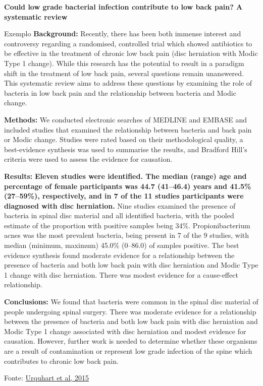 \documentclass{beamer}
\begin{document}
\begin{frame}{\tiny \bf Could low grade bacterial infection contribute to low back pain? A systematic review}
  \begin{exampleblock}{Exemplo}
    \tiny
{\bf Background:}
Recently, there has been both immense interest and controversy regarding a randomised, controlled
trial which showed antibiotics to be effective in the treatment of chronic low back pain (disc herniation with Modic
Type 1 change). While this research has the potential to result in a paradigm shift in the treatment of low back
pain, several questions remain unanswered. This systematic review aims to address these questions by examining
the role of bacteria in low back pain and the relationship between bacteria and Modic change.

{\bf Methods:}
We conducted electronic searches of MEDLINE and EMBASE and included studies that examined the
relationship between bacteria and back pain or Modic change. Studies were rated based on their methodological
quality, a best-evidence synthesis was used to summarise the results, and Bradford Hill’s criteria were used to assess
the evidence for causation.

{\bf Results:}
\alert{\bf \scriptsize Eleven studies were identified.
The median (range) age and percentage of female participants was 44.7 (41–46.4) years and 41.5\% (27–59\%), respectively, and in 7 of the 11 studies participants were diagnosed with disc herniation.}
Nine studies examined the presence of bacteria in spinal disc material and all identified bacteria, with
the pooled estimate of the proportion with positive samples being 34\%.
Propionibacterium acnes was the most
prevalent bacteria, being present in 7 of the 9 studies, with median (minimum, maximum) 45.0\% (0–86.0) of
samples positive. The best evidence synthesis found moderate evidence for a relationship between the presence of
bacteria and both low back pain with disc herniation and Modic Type 1 change with disc herniation. There was
modest evidence for a cause-effect relationship.

{\bf Conclusions:} We found that bacteria were common in the spinal disc material of people undergoing spinal
surgery. There was moderate evidence for a relationship between the presence of bacteria and both low back pain
with disc herniation and Modic Type 1 change associated with disc herniation and modest evidence for causation.
However, further work is needed to determine whether these organisms are a result of contamination or represent
low grade infection of the spine which contributes to chronic low back pain.
  \end{exampleblock}

  \vfill
  \scriptsize
  \hfill Fonte: \href{https://doi.org/10.1186/s12916-015-0267-x}
  {Urquhart et al, 2015}
\end{frame}
\end{document}
